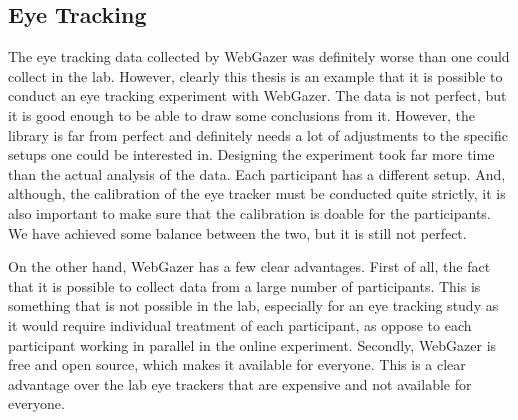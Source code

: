 \subsection{Eye Tracking}
\label{sec:general-discussion:eye-tracking}
The eye tracking data collected by WebGazer was definitely worse than one could collect in the lab. However, clearly this thesis is an example that it is possible to conduct an eye tracking experiment with WebGazer. The data is not perfect, but it is good enough to be able to draw some conclusions from it. However, the library is far from perfect and definitely needs a lot of adjustments to the specific setups one could be interested in. Designing the experiment took far more time than the actual analysis of the data. Each participant has a different setup. And, although, the calibration of the eye tracker must be conducted quite strictly, it is also important to make sure that the calibration is doable for the participants. We have achieved some balance between the two, but it is still not perfect. 

On the other hand, WebGazer has a few clear advantages. First of all, the fact that it is possible to collect data from a large number of participants. This is something that is not possible in the lab, especially for an eye tracking study as it would require individual treatment of each participant, as oppose to each participant working in parallel in the online experiment. Secondly, WebGazer is free and open source, which makes it available for everyone. This is a clear advantage over the lab eye trackers that are expensive and not available for everyone. 